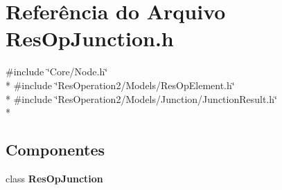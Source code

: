 \section{Referência do Arquivo Res\+Op\+Junction.\+h}
\label{_res_op_junction_8h}
{\ttfamily \#include \char`\"{}Core/\+Node.\+h\char`\"{}}\\*
{\ttfamily \#include \char`\"{}Res\+Operation2/\+Models/\+Res\+Op\+Element.\+h\char`\"{}}\\*
{\ttfamily \#include \char`\"{}Res\+Operation2/\+Models/\+Junction/\+Junction\+Result.\+h\char`\"{}}\\*
\subsection*{Componentes}
\begin{DoxyCompactItemize}
\item 
class {\bf Res\+Op\+Junction}
\end{DoxyCompactItemize}
